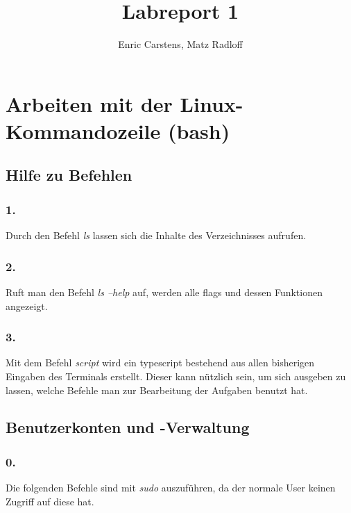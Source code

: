 \documentclass[
    fontsize=12pt,
    headings=small,
    parskip=half,           %
    bibliography=totoc,
    numbers=noenddot,       %
    open=any,               %
    ]{scrreprt}
\title{Labreport 1}
\author{Enric Carstens, Matz Radloff}
\begin{document}
\begin{titlepage}
\begin{center}\Large
    \vfill
    \makeatletter
    {\Large\textsf{\textbf{\@title}}\par}
    \makeatother
    \bigskip
    \makeatletter
    {\@author} \par
    \makeatother
    \bigskip
    \makeatletter
    {\@date}
    \makeatother
    \vfill
    \vfill
\end{center}
\end{titlepage}

\chapter{Arbeiten mit der Linux-Kommandozeile (bash)}

\section{Hilfe zu Befehlen}

\subsection*{1.}
Durch den Befehl \emph{ls} lassen sich die Inhalte des Verzeichnisses aufrufen.

\subsection*{2.}
Ruft man den Befehl \emph{ls --help} auf, werden alle flags und dessen Funktionen angezeigt.

\subsection*{3.}
Mit dem Befehl \emph{script} wird ein typescript bestehend aus allen bisherigen Eingaben des Terminals erstellt. Dieser kann nützlich sein, um sich ausgeben zu lassen, welche Befehle man zur Bearbeitung der Aufgaben benutzt hat.


\section{Benutzerkonten und -Verwaltung}
\subsection*{0.}
Die folgenden Befehle sind mit \emph{sudo} auszuführen, da der normale User keinen Zugriff auf diese hat.
\end{document}
